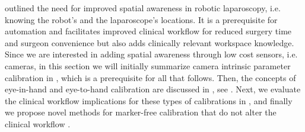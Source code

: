  outlined the need for improved spatial awareness in robotic laparoscopy, i.e. knowing the robot's and the laparoscope's locations. It is a prerequisite for automation and facilitates improved clinical workflow for reduced surgery time and surgeon convenience but also adds clinically relevant workspace knowledge. Since we are interested in adding spatial awareness through low cost sensors, i.e. cameras, in this section we will initially summarize camera intrinsic parameter calibration in , which is a prerequisite for all that follows. Then, the concepts of eye-in-hand and eye-to-hand calibration are discussed in , see . Next, we evaluate the clinical workflow implications for these types of calibrations in , and finally we propose novel methods for marker-free calibration that do not alter the clinical workflow .

